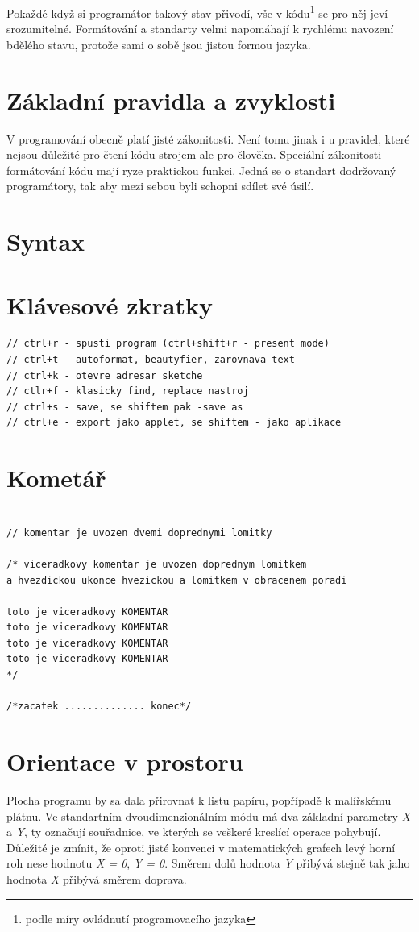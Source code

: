 \documentclass[11pt]{book}
\newcommand{\oddil}[1]{\section{#1}\label{sec:#1}}
\begin{document}
Pokaždé když si programátor takový stav přivodí, vše v kódu\footnote{podle míry ovládnutí programovacího jazyka} se pro něj jeví srozumitelné. Formátování a standarty velmi napomáhají k rychlému navození bdělého stavu, protože sami o sobě jsou jistou formou jazyka.

\oddil{Základní pravidla a zvyklosti}

V programování obecně platí jisté zákonitosti. Není tomu jinak i u pravidel, které nejsou důležité pro čtení kódu strojem ale pro člověka. Speciální zákonitosti formátování kódu mají ryze praktickou funkci. Jedná se o standart dodržovaný programátory, tak aby mezi sebou byli schopni sdílet své úsilí.


\oddil{Syntax}

\oddil{Klávesové zkratky}

\begin{lstlisting}
// ctrl+r - spusti program (ctrl+shift+r - present mode)
// ctrl+t - autoformat, beautyfier, zarovnava text
// ctrl+k - otevre adresar sketche
// ctlr+f - klasicky find, replace nastroj
// ctrl+s - save, se shiftem pak -save as
// ctrl+e - export jako applet, se shiftem - jako aplikace
\end{lstlisting}


\oddil{Kometář}
\begin{lstlisting}

// komentar je uvozen dvemi doprednymi lomitky

/* viceradkovy komentar je uvozen doprednym lomitkem
a hvezdickou ukonce hvezickou a lomitkem v obracenem poradi

toto je viceradkovy KOMENTAR
toto je viceradkovy KOMENTAR
toto je viceradkovy KOMENTAR
toto je viceradkovy KOMENTAR
*/

/*zacatek .............. konec*/

\end{lstlisting}

\oddil{Orientace v prostoru}

Plocha programu by sa dala přirovnat k listu papíru, popřípadě k malířskému plátnu. Ve standartním dvoudimenzionálním módu má dva základní parametry {\em X} a {\em Y}, ty označují souřadnice, ve kterých se veškeré kreslící operace pohybují. Důležité je zmínit, že oproti jisté konvenci v matematických grafech levý horní roh nese hodnotu {\em X = 0}, {\em Y = 0}. Směrem dolů hodnota {\em Y} přibývá stejně tak jaho hodnota {\em X} přibývá směrem doprava.\\
\end{document}

